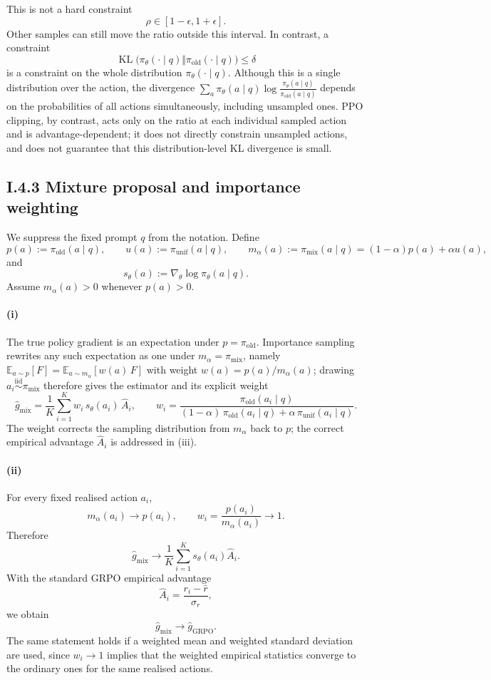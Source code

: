 \documentclass[11pt]{article}
\newcommand{\E}{\mathbb{E}}
\begin{document}
This is not a hard constraint
\[
\rho\in[1-\epsilon,1+\epsilon].
\]
Other samples can still move the ratio outside this interval. In contrast, a
constraint
\[
\operatorname{KL}
\bigl(
\pi_\theta(\cdot\mid q)
\Vert
\pi_{\mathrm{old}}(\cdot\mid q)
\bigr)
\leq\delta
\]
is a constraint on the whole distribution $\pi_\theta(\cdot\mid q)$. Although this
is a single distribution over the action, the divergence
$\sum_a\pi_\theta(a\mid q)\log\frac{\pi_\theta(a\mid q)}{\pi_{\mathrm{old}}(a\mid q)}$
depends on the probabilities of all actions simultaneously, including unsampled
ones. PPO clipping, by contrast, acts only on the ratio at each individual
sampled action and is advantage-dependent; it does not directly constrain
unsampled actions, and does not guarantee that this distribution-level KL
divergence is small.


\subsection*{I.4.3 Mixture proposal and importance weighting}

We suppress the fixed prompt $q$ from the notation. Define
\[
    p(a) := \pi_{\mathrm{old}}(a\mid q),
    \qquad
    u(a) := \pi_{\mathrm{unif}}(a\mid q),
    \qquad
    m_\alpha(a) := \pi_{\mathrm{mix}}(a\mid q)
    = (1-\alpha)p(a)+\alpha u(a),
\]
and
\[
    s_\theta(a):=\nabla_\theta \log \pi_\theta(a\mid q).
\]
Assume $m_\alpha(a)>0$ whenever $p(a)>0$.

\paragraph{(i)}
The true policy gradient is an expectation under $p=\pi_{\mathrm{old}}$. Importance sampling rewrites any such expectation as one
under $m_\alpha=\pi_{\mathrm{mix}}$, namely $\E_{a\sim p}[F]=\E_{a\sim m_\alpha}[w(a)\,F]$ with weight $w(a)=p(a)/m_\alpha(a)$;
drawing $a_i\overset{\mathrm{iid}}{\sim}\pi_{\mathrm{mix}}$ therefore gives the estimator and its explicit weight
\[
    \widehat g_{\mathrm{mix}}=\frac1K\sum_{i=1}^K w_i\,s_\theta(a_i)\,\widehat A_i,
    \qquad
    w_i=\frac{\pi_{\mathrm{old}}(a_i\mid q)}{(1-\alpha)\,\pi_{\mathrm{old}}(a_i\mid q)+\alpha\,\pi_{\mathrm{unif}}(a_i\mid q)}.
\]
The weight corrects the sampling distribution from $m_\alpha$ back to $p$; the correct empirical advantage $\widehat A_i$ is addressed in (iii).

\paragraph{(ii)}
For every fixed realised action $a_i$,
\[
    m_\alpha(a_i)\to p(a_i),
    \qquad
    w_i=\frac{p(a_i)}{m_\alpha(a_i)}\to1.
\]
Therefore
\[
    \widehat g_{\mathrm{mix}}
    \to
    \frac1K\sum_{i=1}^K s_\theta(a_i)\widehat A_i.
\]
With the standard GRPO empirical advantage
\[
    \widehat A_i=\frac{r_i-\bar r}{\sigma_r},
\]
we obtain
\[
    \widehat g_{\mathrm{mix}}\to \widehat g_{\mathrm{GRPO}}.
\]
The same statement holds if a weighted mean and weighted standard deviation are used, since $w_i\to1$ implies that the weighted empirical statistics converge to the ordinary ones for the same realised actions.
\end{document}
